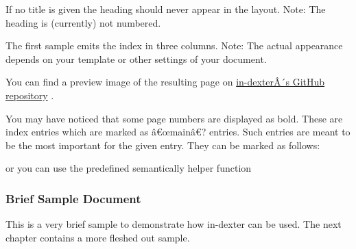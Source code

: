 If no title is given the heading should never appear in the layout.
Note: The heading is (currently) not numbered.

The first sample emits the index in three columns. Note: The actual
appearance depends on your template or other settings of your document.

You can find a preview image of the resulting page on
\href{https://github.com/RolfBremer/in-dexter}{in-dexterÂ´s GitHub
repository} .

You may have noticed that some page numbers are displayed as bold. These
are index entries which are marked as â€œmainâ€? entries. Such entries
are meant to be the most important for the given entry. They can be
marked as follows:

\begin{Shaded}
\begin{Highlighting}[]
\end{Highlighting}
\end{Shaded}

or you can use the predefined semantically helper function

\begin{Shaded}
\begin{Highlighting}[]
\end{Highlighting}
\end{Shaded}

\subsubsection{Brief Sample Document}\label{brief-sample-document}

This is a very brief sample to demonstrate how in-dexter can be used.
The next chapter contains a more fleshed out sample.

\begin{Shaded}
\begin{Highlighting}[]







\end{Highlighting}
\end{Shaded}

